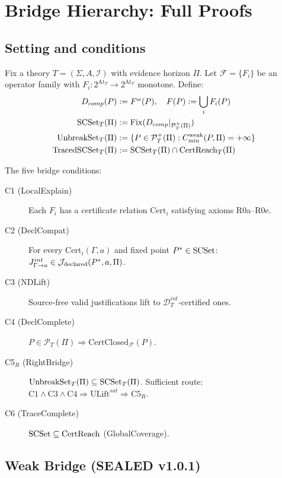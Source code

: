 \section{Bridge Hierarchy: Full Proofs}
\label{app:bridge}

\subsection{Setting and conditions}

Fix a theory $T = (\Sigma, A, \mathcal{I})$ with evidence horizon $\Pi$.
Let $\mathcal{F} = \{F_i\}$ be an operator family with
$F_i : 2^{\mathrm{At}_T} \to 2^{\mathrm{At}_T}$ monotone.
Define:
\begin{align*}
  D_{comp}(P) &:= F^\omega(P), \quad F(P) := \bigcup_i F_i(P) \\
  \mathrm{SCSet}_T(\Pi) &:= \mathrm{Fix}(D_{comp}|_{\mathcal{P}_T^+(\Pi)}) \\
  \mathrm{UnbreakSet}_T(\Pi) &:= \{P \in \mathcal{P}_T^+(\Pi) : C_{\min}^{\mathrm{weak}}(P,\Pi) = +\infty\} \\
  \mathrm{TracedSCSet}_T(\Pi) &:= \mathrm{SCSet}_T(\Pi) \cap \mathrm{CertReach}_T(\Pi)
\end{align*}

The five bridge conditions:
\begin{description}
  \item[C1 (LocalExplain)] Each $F_i$ has a certificate relation $\mathrm{Cert}_i$
    satisfying axioms R0a--R0e.
  \item[C2 (DeclCompat)] For every $\mathrm{Cert}_i(\Gamma,a)$ and fixed point
    $P^*\in\mathrm{SCSet}$: $J^{int}_{\Gamma\to a}\in\mathcal{J}_{\mathrm{declared}}(P^*,a,\Pi)$.
  \item[C3 (NDLift)] Source-free valid justifications lift to
    $\mathcal{D}_T^{int}$-certified ones.
  \item[C4 (DeclComplete)] $P\in\mathcal{P}_T(\Pi)\Rightarrow\mathrm{CertClosed}_{\mathcal{F}}(P)$.
  \item[C5$_R$ (RightBridge)] $\mathrm{UnbreakSet}_T(\Pi)\subseteq\mathrm{SCSet}_T(\Pi)$.
    Sufficient route: $\mathrm{C1}\wedge\mathrm{C3}\wedge\mathrm{C4}\Rightarrow\mathrm{ULift}^{sat}\Rightarrow\mathrm{C5}_R$.
  \item[C6 (TraceComplete)] $\mathrm{SCSet}\subseteq\mathrm{CertReach}$ (GlobalCoverage).
\end{description}

\subsection{Weak Bridge (SEALED v1.0.1)}


